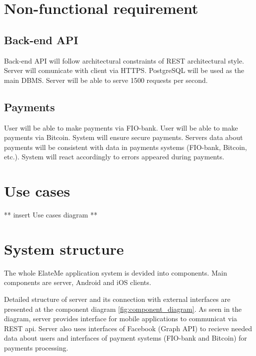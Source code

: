 \section{Non-functional requirement}

\subsection{Back-end \ac{API}}
Back-end API will follow architectural constraints of REST architectural style.
Server will comunicate with client via \ac{HTTPS}.
PostgreSQL will be used as the main DBMS.
Server will be able to serve 1500 requests per second.

\subsection{Payments}
User will be able to make payments via FIO-bank.
User will be able to make payments via Bitcoin.
System will ensure secure payments.
Servers data about payments will be consistent with data in payments systems (FIO-bank, Bitcoin, etc.).
System will react accordingly to errors appeared during payments.

\section{Use cases}
** insert Use cases diagram **



\section{System structure}
The whole ElateMe application system is devided into components. Main components are server, Android and iOS clients.

Detailed structure of server and its connection with external interfaces are presented at the component diagram
\ref{fig:component_diagram}. As seen in the diagram, server provides interface for mobile applications to communicat via
REST api. Server also uses interfaces of Facebook (Graph API) to recieve needed data about users and interfaces of
payment systems (FIO-bank and Bitcoin) for payments processing.

